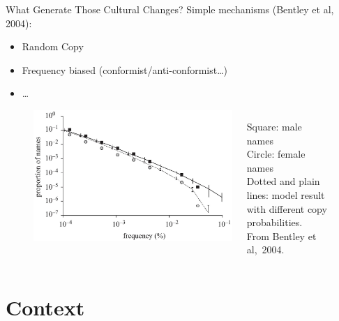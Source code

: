 \documentclass[12pt, notes=show]{beamer}
\begin{document}
\begin{frame}{What Generate Those Cultural Changes?}
	Simple mechanisms (Bentley et al, 2004):
	\begin{itemize}
		\item Random Copy 
		\item Frequency biased (conformist/anti-conformist\dots)
		\item \dots
	\end{itemize}
	\begin{figure}
		\begin{columns}
			\begin{column}{.8\textwidth}
				\centering
				\includegraphics[width=.6\textwidth]{images/powerlawrepartition.jpg}
			\end{column}
			\begin{column}{.3\textwidth}
				\tiny
				Square: male names\\
				Circle: female names\\
				Dotted and plain lines: model result with different copy probabilities.\\
				From Bentley et al,~2004.
			\end{column}
		\end{columns}
	\end{figure}
\end{frame}

\section{Context}
\end{document}
